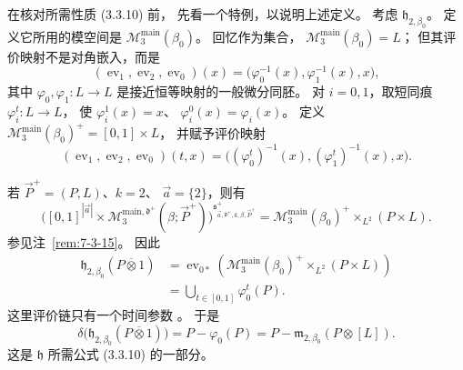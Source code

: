 在核对所需性质 (3.3.10) 前，
先看一个特例，以说明上述定义。
考虑 $\mathfrak h_{2,\beta_0}$。
定义它所用的模空间是
$\mathcal M^{\mathrm{main}}_3(\beta_0)$。
回忆作为集合，
$\mathcal M^{\mathrm{main}}_3(\beta_0)=L$；
但其评价映射不是对角嵌入，而是
\[
(\operatorname{ev}_1,\operatorname{ev}_2,
\operatorname{ev}_0)(x)
=\bigl(\varphi_0^{-1}(x),
\varphi_1^{-1}(x),x\bigr),
\]
其中 $\varphi_0,\varphi_1\colon L\to L$
是接近恒等映射的一般微分同胚。
对 $i=0,1$，取短同痕
$\varphi_i^t\colon L\to L$，
使 $\varphi_i^1(x)=x$、
$\varphi_i^0(x)=\varphi_i(x)$。
定义
$\mathcal M^{\mathrm{main}}_3(\beta_0)^+
=[0,1]\times L$，
并赋予评价映射
\[
(\operatorname{ev}_1,\operatorname{ev}_2,
\operatorname{ev}_0)(t,x)
=\bigl((\varphi_0^t)^{-1}(x),
(\varphi_1^t)^{-1}(x),x\bigr).
\]

若 $\vec P^+=(P,L)$、$k=2$、
$\vec a=\{2\}$，则有
\[
\bigl([0,1]^{|\vec a|}\times
\mathcal M^{\mathrm{main},\mathfrak d^+}_3
(\beta;\vec P^+)\bigr)
^{\mathfrak s^+_{\vec a,\mathfrak d^+,k,\beta,\vec P^+}}
=\mathcal M^{\mathrm{main}}_3(\beta_0)^+
\mathop{\times}_{L^2}(P\times L).
\]
参见注~\ref{rem:7-3-15}。
因此
\[
\begin{aligned}
\mathfrak h_{2,\beta_0}
(P\mathbin{\overline\otimes}1)
&=\operatorname{ev}_{0*}\!\left(
\mathcal M^{\mathrm{main}}_3(\beta_0)^+
\mathop{\times}_{L^2}(P\times L)\right)\\
&=\bigcup_{t\in[0,1]}\varphi_0^t(P).
\end{aligned}
\]
这里评价链只有一个时间参数
。
于是
\begin{equation}
\delta\bigl(\mathfrak h_{2,\beta_0}
(P\mathbin{\overline\otimes}1)\bigr)
=P-\varphi_0(P)
=P-\mathfrak m_{2,\beta_0}(P\otimes[L]).
\tag{7.3.20}\label{eq:7-3-20}
\end{equation}
这是 $\mathfrak h$ 所需公式 (3.3.10)
的一部分。
